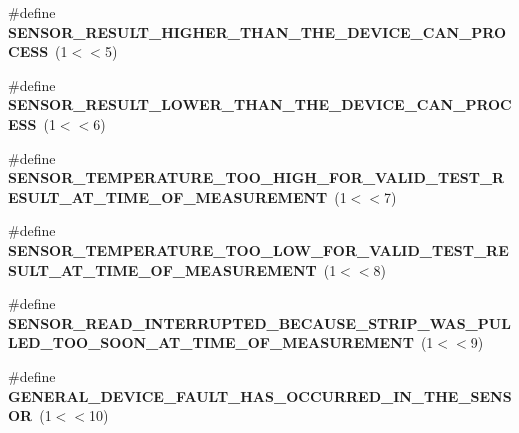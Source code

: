 \begin{DoxyCompactItemize}
\item 
\#define {\bfseries S\+E\+N\+S\+O\+R\+\_\+\+R\+E\+S\+U\+L\+T\+\_\+\+H\+I\+G\+H\+E\+R\+\_\+\+T\+H\+A\+N\+\_\+\+T\+H\+E\+\_\+\+D\+E\+V\+I\+C\+E\+\_\+\+C\+A\+N\+\_\+\+P\+R\+O\+C\+E\+SS}~(1$<$$<$5)\hypertarget{group___b_l_e___g_s_ga3f69fbffd39e1c3a5785f1d3cb34bb07}{}\label{group___b_l_e___g_s_ga3f69fbffd39e1c3a5785f1d3cb34bb07}

\item 
\#define {\bfseries S\+E\+N\+S\+O\+R\+\_\+\+R\+E\+S\+U\+L\+T\+\_\+\+L\+O\+W\+E\+R\+\_\+\+T\+H\+A\+N\+\_\+\+T\+H\+E\+\_\+\+D\+E\+V\+I\+C\+E\+\_\+\+C\+A\+N\+\_\+\+P\+R\+O\+C\+E\+SS}~(1$<$$<$6)\hypertarget{group___b_l_e___g_s_ga535810e8a82055efe7ba213ca716e559}{}\label{group___b_l_e___g_s_ga535810e8a82055efe7ba213ca716e559}

\item 
\#define {\bfseries S\+E\+N\+S\+O\+R\+\_\+\+T\+E\+M\+P\+E\+R\+A\+T\+U\+R\+E\+\_\+\+T\+O\+O\+\_\+\+H\+I\+G\+H\+\_\+\+F\+O\+R\+\_\+\+V\+A\+L\+I\+D\+\_\+\+T\+E\+S\+T\+\_\+\+R\+E\+S\+U\+L\+T\+\_\+\+A\+T\+\_\+\+T\+I\+M\+E\+\_\+\+O\+F\+\_\+\+M\+E\+A\+S\+U\+R\+E\+M\+E\+NT}~(1$<$$<$7)\hypertarget{group___b_l_e___g_s_gab2452683d0835767cfd3ff5f2c289c75}{}\label{group___b_l_e___g_s_gab2452683d0835767cfd3ff5f2c289c75}

\item 
\#define {\bfseries S\+E\+N\+S\+O\+R\+\_\+\+T\+E\+M\+P\+E\+R\+A\+T\+U\+R\+E\+\_\+\+T\+O\+O\+\_\+\+L\+O\+W\+\_\+\+F\+O\+R\+\_\+\+V\+A\+L\+I\+D\+\_\+\+T\+E\+S\+T\+\_\+\+R\+E\+S\+U\+L\+T\+\_\+\+A\+T\+\_\+\+T\+I\+M\+E\+\_\+\+O\+F\+\_\+\+M\+E\+A\+S\+U\+R\+E\+M\+E\+NT}~(1$<$$<$8)\hypertarget{group___b_l_e___g_s_ga10dcfe989fc808aefd6e414caf4281d0}{}\label{group___b_l_e___g_s_ga10dcfe989fc808aefd6e414caf4281d0}

\item 
\#define {\bfseries S\+E\+N\+S\+O\+R\+\_\+\+R\+E\+A\+D\+\_\+\+I\+N\+T\+E\+R\+R\+U\+P\+T\+E\+D\+\_\+\+B\+E\+C\+A\+U\+S\+E\+\_\+\+S\+T\+R\+I\+P\+\_\+\+W\+A\+S\+\_\+\+P\+U\+L\+L\+E\+D\+\_\+\+T\+O\+O\+\_\+\+S\+O\+O\+N\+\_\+\+A\+T\+\_\+\+T\+I\+M\+E\+\_\+\+O\+F\+\_\+\+M\+E\+A\+S\+U\+R\+E\+M\+E\+NT}~(1$<$$<$9)\hypertarget{group___b_l_e___g_s_ga4fb0b4f70b5eda961a64f0b8fea67e8a}{}\label{group___b_l_e___g_s_ga4fb0b4f70b5eda961a64f0b8fea67e8a}

\item 
\#define {\bfseries G\+E\+N\+E\+R\+A\+L\+\_\+\+D\+E\+V\+I\+C\+E\+\_\+\+F\+A\+U\+L\+T\+\_\+\+H\+A\+S\+\_\+\+O\+C\+C\+U\+R\+R\+E\+D\+\_\+\+I\+N\+\_\+\+T\+H\+E\+\_\+\+S\+E\+N\+S\+OR}~(1$<$$<$10)\hypertarget{group___b_l_e___g_s_ga8377219f172bff5a32b6c94609da8f88}{}\label{group___b_l_e___g_s_ga8377219f172bff5a32b6c94609da8f88}


\end{DoxyCompactItemize}
